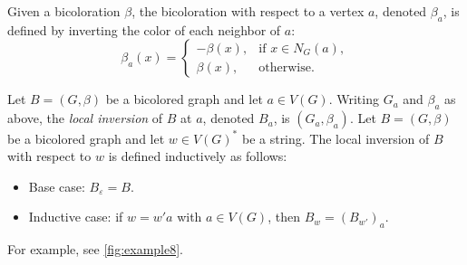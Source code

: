 \documentclass[runningheads,orivec]{llncs}
\begin{document}
Given a bicoloration $\beta$, the bicoloration with respect to a vertex $a$, denoted $\beta_a$, is defined by inverting the color of each neighbor of $a$:
\[
 \beta_{a}(x)=
\begin{cases}
-\beta(x),  & \text{if } x\in N_G(a),\\[4pt]
\beta(x),   & \text{otherwise}.
\end{cases}
\]

Let $B=(G,\beta)$ be a bicolored graph and let $a\in V(G)$. Writing $G_a$ and $\beta_a$ as above, the \emph{local inversion} of $B$ at $a$, denoted $B_a$, is $(G_a,\beta_a)$.
Let $B=(G,\beta)$ be a bicolored graph and let $w\in V(G)^*$ be a string. The local inversion of $B$ with respect to $w$ is defined inductively as follows:
\begin{itemize}
    \item Base case: $B_\varepsilon = B$.
    \item Inductive case: if $w=w'a$ with $a\in V(G)$, then $B_{w} = (B_{w'})_{a}$.
\end{itemize}
For example, see \autoref{fig:example8}.
\end{document}
